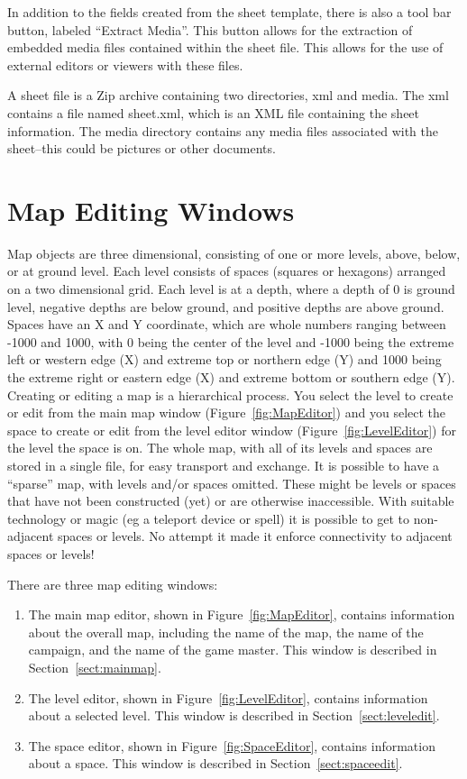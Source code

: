 In addition to the fields created from the sheet template, there is also
a tool bar button, labeled ``Extract Media''.  This button allows for the
extraction of embedded media files contained within the sheet file. 
This allows for the use of external editors or viewers with these files.

A sheet file is a Zip archive containing two directories, xml and media.
The xml contains a file named sheet.xml, which is an XML file containing
the sheet information.  The media directory contains any media files
associated with the sheet--this could be pictures or other documents.

\section{Map Editing Windows}
\label{Map}

Map objects are three dimensional, consisting of one or more levels,
above, below, or at ground level.  Each level consists of spaces
(squares or hexagons) arranged on a two dimensional grid.  Each level
is at a depth, where a depth of 0 is ground level, negative depths are
below ground, and positive depths are above ground.  Spaces have an X
and Y coordinate, which are whole numbers ranging between -1000 and
1000, with 0 being the center of the level and -1000 being the extreme
left or western edge (X) and extreme top or northern edge (Y) and 1000
being the extreme right or eastern edge (X) and extreme bottom or
southern edge (Y). Creating or editing a map is a hierarchical process. 
You select the level to create or edit from the main map window
(Figure~\ref{fig:MapEditor}) and you select the space to create or edit
from the level editor window (Figure~\ref{fig:LevelEditor}) for the
level the space is on.  The whole map, with all of its levels and
spaces are stored in a single file, for easy transport and exchange.  It
is possible to have a ``sparse'' map, with levels and/or spaces
omitted.  These might be levels or spaces that have not been
constructed (yet) or are otherwise inaccessible.  With suitable
technology or magic (eg a teleport device or spell) it is possible to
get to non-adjacent spaces or levels.  No attempt it made it enforce
connectivity to adjacent spaces or levels!

There are three map editing windows:
\begin{enumerate}
\item The main map editor, shown in Figure~\ref{fig:MapEditor}, contains
information about the overall map, including the name of the map, the
name of the campaign, and the name of the game master.  This window is
described in Section~\ref{sect:mainmap}.
\item The level editor, shown in Figure~\ref{fig:LevelEditor}, contains
information about a selected level. This window is
described in Section~\ref{sect:leveledit}.
\item The space editor, shown in Figure~\ref{fig:SpaceEditor}, contains
information about a space. This window is
described in Section~\ref{sect:spaceedit}.
\end{enumerate}

